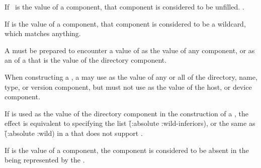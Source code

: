 \endsubsubsubsubsection%

\endsubsubsubsection%

\endsubsubsection%



If \nil\ is the value of a  component,
that component is considered to be unfilled.
\Seesection\MergingPathnames.

\endsubsubsubsection%


If  is the value of a  component,
that component is considered to be a wildcard, which matches anything.

A  must be prepared to encounter a value of 
as the value of any  component,
or as an  of a  that is the value of the directory component.

When constructing a ,
a  may use  as the value of any or all of
the directory, name, type, 
or version component, but must not use  as the value of the host,
or device component.

If  is used as the value of the directory component in the construction
of a , the effect is equivalent to specifying the list
\f{(:absolute :wild-inferiors)},
or the same as \f{(:absolute :wild)} in a  that does not support
.

\endsubsubsubsection%


If  is the value of a  component,
the component is considered to be absent in the 
being represented by the .

